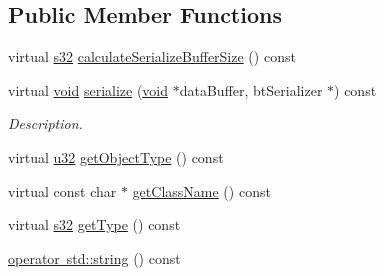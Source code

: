 \subsection*{Public Member Functions}
\begin{DoxyCompactItemize}
\item 
virtual \mbox{\hyperlink{_util_8h_aa62c75d314a0d1f37f79c4b73b2292e2}{s32}} \mbox{\hyperlink{classnjli_1_1_physics_body_soft_builder_ac2e698c90107693b1ce5e3afa88efd5f}{calculate\+Serialize\+Buffer\+Size}} () const
\item 
virtual \mbox{\hyperlink{_thread_8h_af1e856da2e658414cb2456cb6f7ebc66}{void}} \mbox{\hyperlink{classnjli_1_1_physics_body_soft_builder_ab419e0da7b86561aec533b94c9b82ca8}{serialize}} (\mbox{\hyperlink{_thread_8h_af1e856da2e658414cb2456cb6f7ebc66}{void}} $\ast$data\+Buffer, bt\+Serializer $\ast$) const
\begin{DoxyCompactList}\small\item\em Description. \end{DoxyCompactList}\item 
virtual \mbox{\hyperlink{_util_8h_a10e94b422ef0c20dcdec20d31a1f5049}{u32}} \mbox{\hyperlink{classnjli_1_1_physics_body_soft_builder_a40ced68212472cadc5e7a23450a665e4}{get\+Object\+Type}} () const
\item 
virtual const char $\ast$ \mbox{\hyperlink{classnjli_1_1_physics_body_soft_builder_ad715623a45b652ea56a8eceb44558267}{get\+Class\+Name}} () const
\item 
virtual \mbox{\hyperlink{_util_8h_aa62c75d314a0d1f37f79c4b73b2292e2}{s32}} \mbox{\hyperlink{classnjli_1_1_physics_body_soft_builder_afccd0cd50e60619b3d47016ed21537f8}{get\+Type}} () const
\item 
\mbox{\hyperlink{classnjli_1_1_physics_body_soft_builder_a992c9000d0efcb356069fab23672c85e}{operator std\+::string}} () const
\end{DoxyCompactItemize}
